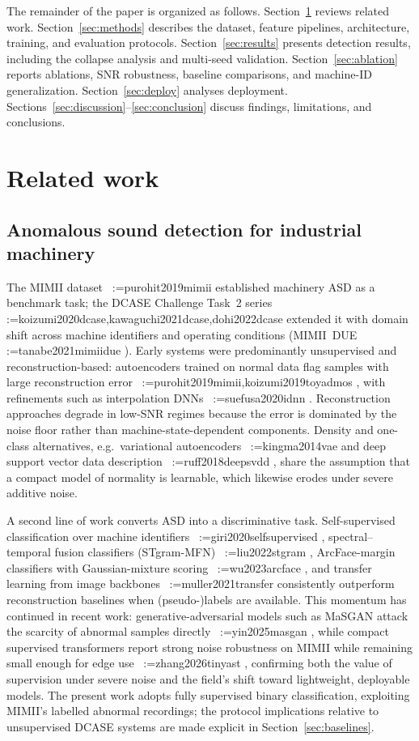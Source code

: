 \documentclass[review,nopreprintline]{elsarticle}
\makeatletter
\newif\ifmc@notfirst
\let\@oldcite\cite
\def\mc@splitcite#1{%
    \begingroup
    \mc@notfirstfalse
    \@for\@citekey:=#1\do{%
      \ifmc@notfirst, \fi
      \mc@notfirsttrue
      \@oldcite{\@citekey}%
    }%
    \endgroup
  }%
\def\cite#1{\protect\mc@splitcite{#1}}%
\makeatother
\begin{document}
The remainder of the paper is organized as follows. Section~\ref{sec:related} reviews related work. Section~\ref{sec:methods} describes the dataset, feature pipelines, architecture, training, and evaluation protocols. Section~\ref{sec:results} presents detection results, including the collapse analysis and multi-seed validation. Section~\ref{sec:ablation} reports ablations, SNR robustness, baseline comparisons, and machine-ID generalization. Section~\ref{sec:deploy} analyses deployment. Sections~\ref{sec:discussion}--\ref{sec:conclusion} discuss findings, limitations, and conclusions.

\section{Related work}
\label{sec:related}

\subsection{Anomalous sound detection for industrial machinery}
The MIMII dataset~\cite{purohit2019mimii} established machinery ASD as a benchmark task; the DCASE Challenge Task~2 series~\cite{koizumi2020dcase,kawaguchi2021dcase,dohi2022dcase} extended it with domain shift across machine identifiers and operating conditions (MIMII~DUE~\cite{tanabe2021mimiidue}). Early systems were predominantly unsupervised and reconstruction-based: autoencoders trained on normal data flag samples with large reconstruction error~\cite{purohit2019mimii,koizumi2019toyadmos}, with refinements such as interpolation DNNs~\cite{suefusa2020idnn}. Reconstruction approaches degrade in low-SNR regimes because the error is dominated by the noise floor rather than machine-state-dependent components. Density and one-class alternatives, e.g.\ variational autoencoders~\cite{kingma2014vae} and deep support vector data description~\cite{ruff2018deepsvdd}, share the assumption that a compact model of normality is learnable, which likewise erodes under severe additive noise.

A second line of work converts ASD into a discriminative task. Self-supervised classification over machine identifiers~\cite{giri2020selfsupervised}, spectral--temporal fusion classifiers (STgram-MFN)~\cite{liu2022stgram}, ArcFace-margin classifiers with Gaussian-mixture scoring~\cite{wu2023arcface}, and transfer learning from image backbones~\cite{muller2021transfer} consistently outperform reconstruction baselines when (pseudo-)labels are available. This momentum has continued in recent work: generative-adversarial models such as MaSGAN attack the scarcity of abnormal samples directly~\cite{yin2025masgan}, while compact supervised transformers report strong noise robustness on MIMII while remaining small enough for edge use~\cite{zhang2026tinyast}, confirming both the value of supervision under severe noise and the field's shift toward lightweight, deployable models. The present work adopts fully supervised binary classification, exploiting MIMII's labelled abnormal recordings; the protocol implications relative to unsupervised DCASE systems are made explicit in Section~\ref{sec:baselines}.
\end{document}
